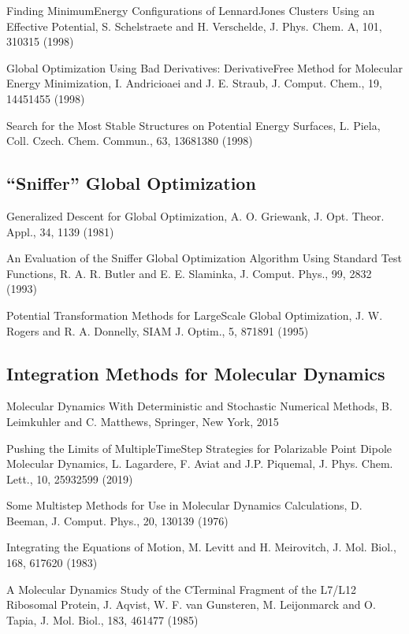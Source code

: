\documentclass[letterpaper,11pt,english]{sphinxmanual}
\begin{document}
Finding Minimum\sphinxhyphen{}Energy Configurations of Lennard\sphinxhyphen{}Jones Clusters Using an Effective Potential, S. Schelstraete and H. Verschelde, J. Phys. Chem. A, 101, 310\sphinxhyphen{}315 (1998)

Global Optimization Using Bad Derivatives: Derivative\sphinxhyphen{}Free Method for Molecular Energy Minimization, I. Andricioaei and J. E. Straub, J. Comput. Chem., 19, 1445\sphinxhyphen{}1455 (1998)

Search for the Most Stable Structures on Potential Energy Surfaces, L. Piela, Coll. Czech. Chem. Commun., 63, 1368\sphinxhyphen{}1380 (1998)


\subsection{“Sniffer” Global Optimization}
\label{\detokenize{text/references:sniffer-global-optimization}}
Generalized Descent for Global Optimization, A. O. Griewank, J. Opt. Theor. Appl., 34, 11\sphinxhyphen{}39 (1981)

An Evaluation of the Sniffer Global Optimization Algorithm Using Standard Test Functions, R. A. R. Butler and E. E. Slaminka, J. Comput. Phys., 99, 28\sphinxhyphen{}32 (1993)

Potential Transformation Methods for Large\sphinxhyphen{}Scale Global Optimization, J. W. Rogers and R. A. Donnelly, SIAM J. Optim., 5, 871\sphinxhyphen{}891 (1995)


\subsection{Integration Methods for Molecular Dynamics}
\label{\detokenize{text/references:integration-methods-for-molecular-dynamics}}
Molecular Dynamics With Deterministic and Stochastic Numerical Methods, B. Leimkuhler and C. Matthews, Springer, New York, 2015

Pushing the Limits of Multiple\sphinxhyphen{}Time\sphinxhyphen{}Step Strategies for Polarizable Point Dipole Molecular Dynamics, L. Lagardere, F. Aviat and J.\sphinxhyphen{}P. Piquemal, J. Phys. Chem. Lett., 10, 2593\sphinxhyphen{}2599 (2019)

Some Multistep Methods for Use in Molecular Dynamics Calculations, D. Beeman, J. Comput. Phys., 20, 130\sphinxhyphen{}139 (1976)

Integrating the Equations of Motion, M. Levitt and H. Meirovitch, J. Mol. Biol., 168, 617\sphinxhyphen{}620 (1983)

A Molecular Dynamics Study of the C\sphinxhyphen{}Terminal Fragment of the L7/L12 Ribosomal Protein, J. Aqvist, W. F. van Gunsteren, M. Leijonmarck and O. Tapia, J. Mol. Biol., 183, 461\sphinxhyphen{}477 (1985)
\end{document}
